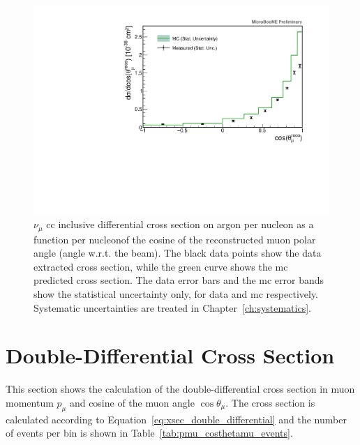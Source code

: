 \begin{figure}[]
\centering
\includegraphics[width=.80\textwidth]{images/XSecCosThetaMu/trkcostheta_xsec}
\caption[$d\sigma/d\cos\theta_\mu$ Single Differential Cross Section (Stat. Unc. Only)]{$\nu_\mu$ \acrshort{cc} inclusive differential cross section on argon per nucleon as a function per nucleonof the cosine of the reconstructed muon polar angle (angle w.r.t. the beam). The black data points show the data extracted cross section, while the green curve shows the \acrshort{mc} predicted cross section. The data error bars and the \acrshort{mc} error bands show the statistical uncertainty only, for data and \acrshort{mc} respectively. Systematic uncertainties are treated in Chapter~\ref{ch:systematics}.}
\label{fig:trkcostheta_xsec_cv}
\end{figure}









\clearpage
\section{Double-Differential Cross Section}
\label{sec:mumom_muangle_xsec}

This section shows the calculation of the double-differential cross section in muon momentum $p_\mu$ and cosine of the muon angle $\cos\theta_\mu$. 
The cross section is calculated according to Equation~\eqref{eq:xsec_double_differential} and the number of events per bin is shown in Table~\ref{tab:pmu_costhetamu_events}.


